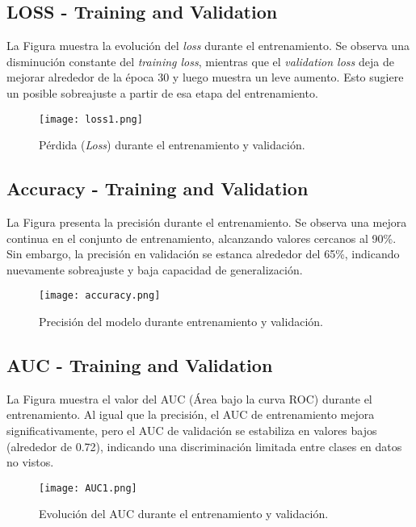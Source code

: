 \documentclass[11pt,a4paper]{article}
\begin{document}
\subsection{LOSS - Training and Validation}
La Figura muestra la evolución del \textit{loss} durante el entrenamiento. Se observa una disminución constante del \textit{training loss}, mientras que el \textit{validation loss} deja de mejorar alrededor de la época 30 y luego muestra un leve aumento. Esto sugiere un posible sobreajuste a partir de esa etapa del entrenamiento.

\begin{figure}[H]
    \centering
    \texttt{[image: loss1.png]}
    \caption{Pérdida (\textit{Loss}) durante el entrenamiento y validación.}
    \label{fig:loss}
\end{figure}

\subsection{Accuracy - Training and Validation}
La Figura presenta la precisión durante el entrenamiento. Se observa una mejora continua en el conjunto de entrenamiento, alcanzando valores cercanos al 90\%. Sin embargo, la precisión en validación se estanca alrededor del 65\%, indicando nuevamente sobreajuste y baja capacidad de generalización.

\begin{figure}[H]
    \centering
    \texttt{[image: accuracy.png]}
    \caption{Precisión del modelo durante entrenamiento y validación.}
    \label{fig:accuracy}
\end{figure}

\subsection{AUC - Training and Validation}
La Figura muestra el valor del AUC (Área bajo la curva ROC) durante el entrenamiento. Al igual que la precisión, el AUC de entrenamiento mejora significativamente, pero el AUC de validación se estabiliza en valores bajos (alrededor de 0.72), indicando una discriminación limitada entre clases en datos no vistos.

\begin{figure}[H]
    \centering
    \texttt{[image: AUC1.png]}
    \caption{Evolución del AUC durante el entrenamiento y validación.}
    \label{fig:auc}
\end{figure}
\end{document}
